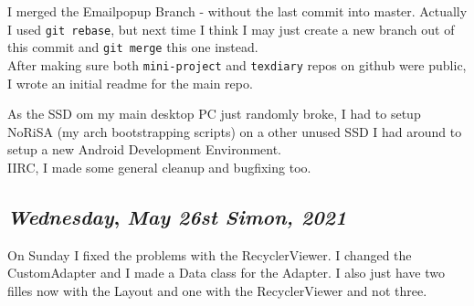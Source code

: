 I merged the Emailpopup Branch - without the last commit into master. Actually I used \texttt{git rebase}, but next time I think I may just create a new branch out of this commit and \texttt{git merge} this one instead.\\

After making sure both \texttt{mini-project} and \texttt{texdiary} repos on github were public, I wrote an initial readme for the main repo.

As the SSD om my main desktop PC just randomly broke, I had to setup NoRiSA (my arch bootstrapping scripts) on a other unused SSD I had around to setup a new Android Development Environment.\\

IIRC, I made some general cleanup and bugfixing too.



\def\day{\textit{May 26st Simon, 2021}}
\def\weekday{\textit{Wednesday}}
\subsection*{\weekday, \day}

On Sunday I fixed the problems with the RecyclerViewer. I changed the CustomAdapter and I made a Data class for the Adapter. I also  just have two filles now with the Layout and one with the
RecyclerViewer and not three. 





